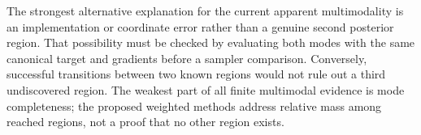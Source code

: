 \documentclass[11pt]{article}
\begin{document}
The strongest alternative explanation for the current apparent multimodality is an
implementation or coordinate error rather than a genuine second posterior region.
That possibility must be checked by evaluating both modes with the same canonical
target and gradients before a sampler comparison.  Conversely, successful transitions
between two known regions would not rule out a third undiscovered region.  The weakest
part of all finite multimodal evidence is mode completeness; the proposed weighted
methods address relative mass among reached regions, not a proof that no other region
exists.



\end{document}

